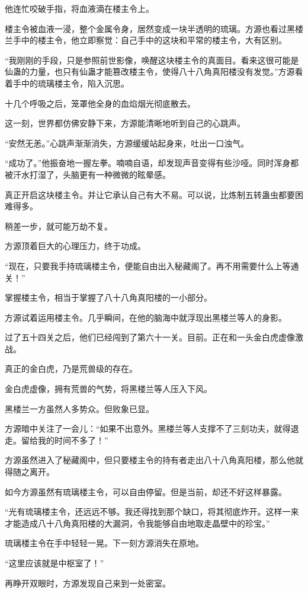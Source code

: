\begin{this_body}
他连忙咬破手指，将血液滴在楼主令上。

楼主令被血液一浸，整个金属令身，居然变成一块半透明的琉璃。方源也看过黑楼兰手中的楼主令，他立即察觉：自己手中的这块和平常的楼主令，大有区别。

“我刚刚的手段，只是参照前世影像，唤醒这块楼主令的真面目。看来这很可能是仙蛊的力量，也只有仙蛊才能篡改楼主令，使得八十八角真阳楼没有发觉。”方源看着手中的琉璃楼主令，陷入沉思。

十几个呼吸之后，笼罩他全身的血焰烟光彻底散去。

这一刻，世界都仿佛安静下来，方源能清晰地听到自己的心跳声。

“安然无恙。”心跳声渐渐消失，方源缓缓站起身来，吐出一口浊气。

“成功了。”他振奋地一握左拳。喃喃自语，却发现声音变得有些沙哑。同时浑身都被汗水打湿了，头脑更有一种微微的眩晕感。

真正开启这块楼主令。并让它承认自己有大不易。可以说，比炼制五转蛊虫都要困难得多。

稍差一步，就可能万劫不复。

方源顶着巨大的心理压力，终于功成。

“现在，只要我手持琉璃楼主令，便能自由出入秘藏阁了。再不用需要什么上等通关！”

掌握楼主令，相当于掌握了八十八角真阳楼的一小部分。

方源试着运用楼主令。几乎瞬间，在他的脑海中就浮现出黑楼兰等人的身影。

过了五十四关之后，他们已经闯到了第六十一关。目前。正在和一头金白虎虚像激战。

真正的金白虎，乃是荒兽级的存在。

金白虎虚像，拥有荒兽的气势，将黑楼兰等人压入下风。

黑楼兰一方虽然人多势众。但败象已显。

方源暗中关注了一会儿：“如果不出意外。黑楼兰等人支撑不了三刻功夫，就得退走。留给我的时间不多了！”

方源虽然进入了秘藏阁中，但只要楼主令的持有者走出八十八角真阳楼，那么他就得随之离开。

如今方源虽然有琉璃楼主令，可以自由停留。但是当前，却还不好这样暴露。

“光有琉璃楼主令，还远远不够。我还得找到那个缺口，将其彻底炸开。这样一来才能造成八十八角真阳楼的大漏洞，令我能够自由地取走晶壁中的珍宝。”

琉璃楼主令在手中轻轻一晃。下一刻方源消失在原地。

“这里应该就是中枢室了！”

再睁开双眼时，方源发现自己来到一处密室。


\end{this_body}
